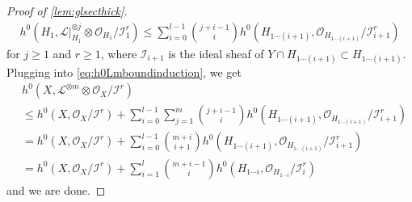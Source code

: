 \documentclass[12pt]{amsart}
\theoremstyle{plain}
\theoremstyle{definition}
\numberwithin{equation}{section}
\def\O{{ \mathcal{O}}}
\def\I{{ \mathcal{I}}}
\def\L{{ \mathcal{L}}}
\begin{document}
\begin{proof}[Proof of \cref{lem:glsecthick}]
\begin{align}
h^{0}(H_{1}, \L|_{H_{1}}^{ \otimes j} \otimes \O_{H_{1}}/\I_{1}^{r})
\leq 
\sum_{i=0}^{l-1} \binom{j+i-1}{i} h^{0}(H_{1\cdots (i+1)}, \O_{H_{1\cdots (i+1)}}/\I_{i+1}^{r})
\end{align}
for $j \geq 1$ and $r \geq 1$,
where $\I_{i+1}$ is the ideal sheaf of $Y \cap H_{1\cdots (i+1)} \subset H_{1\cdots (i+1)}$.
Plugging into \cref{eq:h0Lmboundinduction}, we get
\begin{align}
&h^{0}(X, \L^{ \otimes m}  \otimes \O_{X}/\I^{r} ) \\
&\leq 
h^{0}(X, \O_{X}/\I^{r}) + 
\sum_{i=0}^{l-1} \sum_{j=1}^{m}\binom{j+i-1}{i} h^{0}(H_{1\cdots (i+1)}, \O_{H_{1\cdots (i+1)}}/\I_{i+1}^{r})\\
&=
h^{0}(X, \O_{X}/\I^{r}) + 
\sum_{i=0}^{l-1} \binom{m+i}{i+1} h^{0}(H_{1\cdots (i+1)}, \O_{H_{1\cdots (i+1)}}/\I_{i+1}^{r})\\
&=
h^{0}(X, \O_{X}/\I^{r}) + 
\sum_{i=1}^{l} \binom{m+i-1}{i} h^{0}(H_{1\cdots i}, \O_{H_{1\cdots i}}/\I_{i}^{r})
\end{align}
and we are done.
\end{proof}
\end{document}
